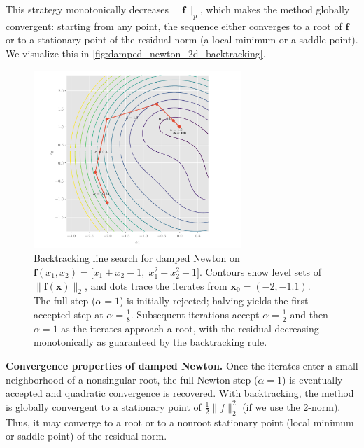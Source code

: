 This strategy monotonically decreases \(\lVert \mathbf{f}\rVert_p\), which makes the method globally convergent: starting from any point, the sequence either converges to a root of \(\mathbf{f}\) or to a stationary point of the residual norm (a local minimum or a saddle point). We visualize this in \autoref{fig:damped_newton_2d_backtracking}.

\begin{figure}[h]
\centering
\includegraphics[width=0.7\textwidth]{figs/nle/damped_newton_2d_backtracking.pdf}
\caption{Backtracking line search for damped Newton on \(\mathbf{f}(x_1,x_2)=\big[x_1+x_2-1,\;x_1^2+x_2^2-1\big]\). Contours show level sets of \(\|\mathbf{f}(\mathbf{x})\|_2\), and dots trace the iterates from \(\mathbf{x}_0=(-2,-1.1)\). The full step (\(\alpha=1\)) is initially rejected; halving yields the first accepted step at \(\alpha=\tfrac{1}{8}\). Subsequent iterations accept \(\alpha=\tfrac12\) and then \(\alpha=1\) as the iterates approach a root, with the residual decreasing monotonically as guaranteed by the backtracking rule.}
\label{fig:damped_newton_2d_backtracking}
\end{figure}


\textbf{Convergence properties of damped Newton.}
Once the iterates enter a small neighborhood of a nonsingular root, the full Newton step ($\alpha=1$) is eventually accepted and quadratic convergence is recovered. With backtracking, the method is globally convergent to a stationary point of $\tfrac12\|f\|_2^2$ (if we use the 2-norm). Thus, it may converge to a root or to a nonroot stationary point (local minimum or saddle point) of the residual norm.

